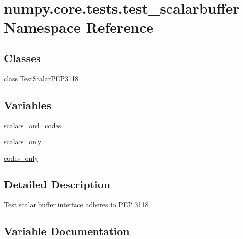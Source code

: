 \hypertarget{namespacenumpy_1_1core_1_1tests_1_1test__scalarbuffer}{}\section{numpy.\+core.\+tests.\+test\+\_\+scalarbuffer Namespace Reference}
\label{namespacenumpy_1_1core_1_1tests_1_1test__scalarbuffer}
\subsection*{Classes}
\begin{DoxyCompactItemize}
\item 
class \hyperlink{classnumpy_1_1core_1_1tests_1_1test__scalarbuffer_1_1TestScalarPEP3118}{Test\+Scalar\+P\+E\+P3118}
\end{DoxyCompactItemize}
\subsection*{Variables}
\begin{DoxyCompactItemize}
\item 
\hyperlink{namespacenumpy_1_1core_1_1tests_1_1test__scalarbuffer_a939b7ceac59c9dcee582c2862377c9bb}{scalars\+\_\+and\+\_\+codes}
\item 
\hyperlink{namespacenumpy_1_1core_1_1tests_1_1test__scalarbuffer_a3eda753ee21a3a6722cef54701268829}{scalars\+\_\+only}
\item 
\hyperlink{namespacenumpy_1_1core_1_1tests_1_1test__scalarbuffer_a2e81edcc402c42ab5e0013c633f51772}{codes\+\_\+only}
\end{DoxyCompactItemize}


\subsection{Detailed Description}
\begin{DoxyVerb}Test scalar buffer interface adheres to PEP 3118
\end{DoxyVerb}
 

\subsection{Variable Documentation}
\mbox{\label{namespacenumpy_1_1core_1_1tests_1_1test__scalarbuffer_a2e81edcc402c42ab5e0013c633f51772}} 
